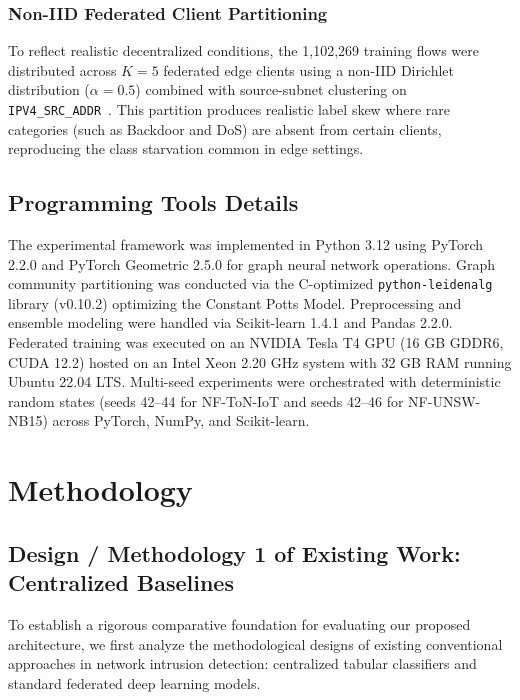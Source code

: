 \documentclass[12pt,a4paper]{report}
\begin{document}
\subsection{Non-IID Federated Client Partitioning}
To reflect realistic decentralized conditions, the 1,102,269 training flows were distributed across $K = 5$ federated edge clients using a non-IID Dirichlet distribution ($\alpha = 0.5$) combined with source-subnet clustering on \texttt{IPV4\_SRC\_ADDR}~\cite{hsu2019noniid, zhao2018federated}. This partition produces realistic label skew where rare categories (such as Backdoor and DoS) are absent from certain clients, reproducing the class starvation common in edge settings.

\section{Programming Tools Details}\label{sec:tools}

The experimental framework was implemented in Python 3.12 using PyTorch 2.2.0 and PyTorch Geometric 2.5.0 for graph neural network operations. Graph community partitioning was conducted via the C-optimized \texttt{python-leidenalg} library (v0.10.2) optimizing the Constant Potts Model. Preprocessing and ensemble modeling were handled via Scikit-learn 1.4.1 and Pandas 2.2.0. Federated training was executed on an NVIDIA Tesla T4 GPU (16 GB GDDR6, CUDA 12.2) hosted on an Intel Xeon 2.20 GHz system with 32 GB RAM running Ubuntu 22.04 LTS. Multi-seed experiments were orchestrated with deterministic random states (seeds 42--44 for NF-ToN-IoT and seeds 42--46 for NF-UNSW-NB15) across PyTorch, NumPy, and Scikit-learn.


\chapter{Methodology}\label{ch:methodology}
\label{chap:methodology}

\section{Design / Methodology 1 of Existing Work: Centralized Baselines}\label{sec:existing1}
\label{sec:methodology1}

To establish a rigorous comparative foundation for evaluating our proposed architecture, we first analyze the methodological designs of existing conventional approaches in network intrusion detection: centralized tabular classifiers and standard federated deep learning models.
\end{document}
